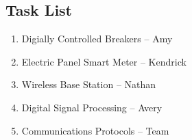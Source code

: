 \documentclass[titlepage,11pt,letterpaper]{article}
\begin{document}
\begin{spacing}{1.1}
\clearpage
\section{Task List}
\begin{enumerate}
\item Digially Controlled Breakers -- Amy
\item Electric Panel Smart Meter -- Kendrick
\item Wireless Base Station -- Nathan
\item Digital Signal Processing -- Avery
\item Communications Protocols -- Team
\end{enumerate}

\end{spacing}
\end{document}
